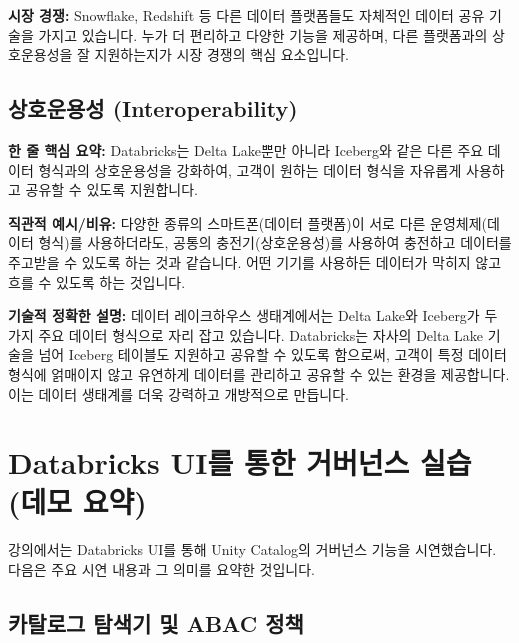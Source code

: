 \documentclass[11pt,a4paper]{article}
\begin{document}
\begin{tcolorbox}[summarybox]
\textbf{시장 경쟁:}
Snowflake, Redshift 등 다른 데이터 플랫폼들도 자체적인 데이터 공유 기술을 가지고 있습니다. 누가 더 편리하고 다양한 기능을 제공하며, 다른 플랫폼과의 상호운용성을 잘 지원하는지가 시장 경쟁의 핵심 요소입니다.
\end{tcolorbox}

\newpage
\subsection*{상호운용성 (Interoperability)}

\begin{keyconceptbox}
\textbf{한 줄 핵심 요약:} Databricks는 Delta Lake뿐만 아니라 Iceberg와 같은 다른 주요 데이터 형식과의 상호운용성을 강화하여, 고객이 원하는 데이터 형식을 자유롭게 사용하고 공유할 수 있도록 지원합니다.
\end{keyconceptbox}

\textbf{직관적 예시/비유:}
다양한 종류의 스마트폰(데이터 플랫폼)이 서로 다른 운영체제(데이터 형식)를 사용하더라도, 공통의 충전기(상호운용성)를 사용하여 충전하고 데이터를 주고받을 수 있도록 하는 것과 같습니다. 어떤 기기를 사용하든 데이터가 막히지 않고 흐를 수 있도록 하는 것입니다.

\textbf{기술적 정확한 설명:}
데이터 레이크하우스 생태계에서는 Delta Lake와 Iceberg가 두 가지 주요 데이터 형식으로 자리 잡고 있습니다. Databricks는 자사의 Delta Lake 기술을 넘어 Iceberg 테이블도 지원하고 공유할 수 있도록 함으로써, 고객이 특정 데이터 형식에 얽매이지 않고 유연하게 데이터를 관리하고 공유할 수 있는 환경을 제공합니다. 이는 데이터 생태계를 더욱 강력하고 개방적으로 만듭니다.

\newpage
\section*{Databricks UI를 통한 거버넌스 실습 (데모 요약)}

강의에서는 Databricks UI를 통해 Unity Catalog의 거버넌스 기능을 시연했습니다. 다음은 주요 시연 내용과 그 의미를 요약한 것입니다.

\subsection*{카탈로그 탐색기 및 ABAC 정책}
\end{document}
